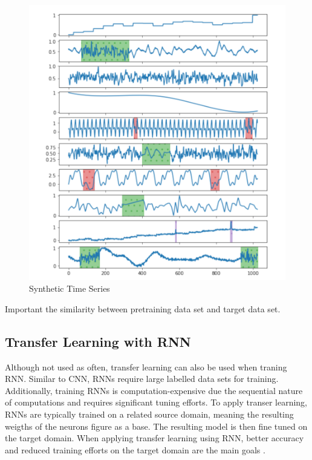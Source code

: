 \begin{figure}[h]
	\centering
	\includegraphics[scale=0.32]{Figures/Synthetic Time Series}
	\decoRule
	\caption[Synthetic Time Series]{Synthetic Time Series \parencite{Wen2019}}
	\label{fig:Pretraing data}
\end{figure}

Important the similarity between pretraining data set and target data set.

\subsection{Transfer Learning with RNN}
Although not used as often, transfer learning can also be used when traning RNN. Similar to CNN, RNNs require large labelled data sets for training. Additionally, training RNNs is computation-expensive due the sequential nature of computations and requires significant tuning efforts. To apply transer learning, RNNs are typically trained on a related source domain, meaning the resulting weigths of the neurons figure as a base. The resulting model is then fine tuned on the target domain. When applying transfer learning using RNN, better accuracy and reduced training efforts on the target domain are the main goals .

